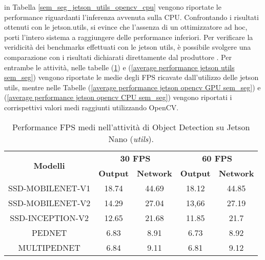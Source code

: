 in Tabella \ref{sem_seg_jetson_utils_opencv_cpu} vengono riportate le performance riguardanti l'inferenza 
avvenuta sulla CPU. Confrontando i risultati ottenuti con le jetson.utils, 
si evince che l'assenza di un ottimizzatore ad hoc, porti l'intero sistema a 
raggiungere delle performance inferiori. Per verificare la veridicità dei benchmarks 
effettuati con le jetson utils, è possibile svolgere una comparazione 
con i risultati dichiarati direttamente dal produttore \cite{performance_obj_det_jetson}. Per entrambe le 
attività, nelle tabelle (\ref{average performance jetson utils obj_det}) e (\ref{average performance jetson utils sem_seg}) vengono riportate le medie degli FPS 
ricavate dall'utilizzo delle jetson utils, mentre nelle Tabelle (\ref{average performance jetson opencv GPU sem_seg}) e (\ref{average performance jetson opencv CPU sem_seg})  
vengono riportati i corrispettivi valori medi raggiunti utilizzando OpenCV.

\begin{table}
    \renewcommand{\baselinestretch}{1}
    \centering
    \begin{adjustbox}{max width=\textwidth}
    \begin{tabular}{|c||c|c||c|c||}
        \hline
        \multirow{2}{*}{\bfseries{\Large Modelli}} & \multicolumn{2}{c||}{\bfseries{30 FPS}} & \multicolumn{2}{c||}{\bfseries{60 FPS}}\\            & \bfseries{Output} & \bfseries{Network} & \bfseries{Output} & \bfseries{Network}\\
        \hline
        \hline
        SSD-MOBILENET-V1 & 18.74 & 44.69 & 18.12 & 44.85\\
        \hline
        SSD-MOBILENET-V2 & 14.29 & 27.04 & 13,66 & 27.19\\
        \hline 
        SSD-INCEPTION-V2 & 12.65 & 21.68 & 11.85 & 21.7\\
        \hline
        PEDNET & 6.83 &  8.91 & 6.73 & 8.92\\
        \hline
        MULTIPEDNET & 6.84 & 9.11 & 6.81 & 9.12\\
        \hline
    \end{tabular}
    \end{adjustbox}
    \vspace{0.5cm}
    \caption{Performance FPS medi nell'attività di Object Detection su Jetson Nano (\emph{utils}).}
    \label{average performance jetson utils obj_det}
\end{table}

